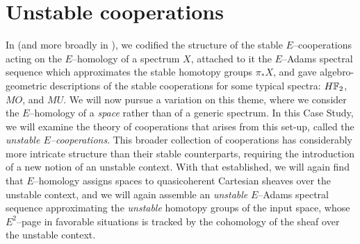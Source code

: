 
\chapter{Unstable cooperations}\label{UnstableCooperationsChapter}


In  (and more broadly in ), we codified the structure of the stable $E$--cooperations acting on the $E$--homology of a spectrum $X$, attached to it the $E$--Adams spectral sequence which approximates the stable homotopy groups $\pi_* X$, and gave algebro-geometric descriptions of the stable cooperations for some typical spectra: $\HFtwo$, $MO$, and $MU$.  We will now pursue a variation on this theme, where we consider the $E$--homology of a \emph{space} rather than of a generic spectrum.  In this Case Study, we will examine the theory of cooperations that arises from this set-up, called the \textit{unstable $E$--cooperations}.  This broader collection of cooperations has considerably more intricate structure than their stable counterparts, requiring the introduction of a new notion of an unstable context.  With that established, we will again find that $E$--homology assigns spaces to quasicoherent Cartesian sheaves over the unstable context, and we will again assemble an \emph{unstable} $E$--Adams spectral sequence approximating the \emph{unstable} homotopy groups of the input space, whose $E^2$--page in favorable situations is tracked by the cohomology of the sheaf over the unstable context.

